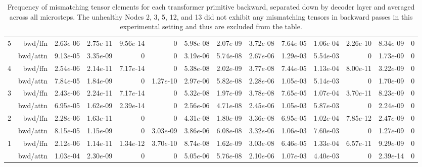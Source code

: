 \begin{table*}[t]
\begin{center}
\begin{tiny}
\begin{sc}
\begin{tabular}{rrrrrrrrrrrrrr}
\midrule
\multirow{2}{*}{5}             & bwd/ffn   & 2.63$e$-06 & 2.75$e$-11 & 9.56$e$-14 & 0 & 5.98$e$-08 & 2.07$e$-09 & 3.72$e$-08 & 7.64$e$-05 & 1.06$e$-04 & 2.26$e$-10 & 8.34$e$-09 & 0 \\
              & bwd/attn  & 9.13$e$-05 & 3.35$e$-09 & 0 & 0 & 3.19$e$-06 & 5.74$e$-08 & 2.67$e$-06 & 1.29$e$-03 & 5.54$e$-03 & 0 & 1.73$e$-09 & 0 \\
\midrule
\multirow{2}{*}{4}             & bwd/ffn   & 2.54$e$-06 & 2.14$e$-11 & 7.17$e$-14 & 0 & 5.38$e$-08 & 2.02$e$-09 & 3.77$e$-08 & 7.44$e$-05 & 1.13$e$-04 & 8.00$e$-11 & 3.22$e$-09 & 0 \\
              & bwd/attn  & 7.84$e$-05 & 1.84$e$-09 & 0 & 1.27$e$-10 & 2.97$e$-06 & 5.82$e$-08 & 2.28$e$-06 & 1.05$e$-03 & 5.14$e$-03 & 0 & 1.70$e$-09 & 0 \\
\midrule
\multirow{2}{*}{3}             & bwd/ffn   & 2.43$e$-06 & 2.24$e$-11 & 7.17$e$-14 & 0 & 5.32$e$-08 & 1.97$e$-09 & 3.78$e$-08 & 7.65$e$-05 & 1.07$e$-04 & 3.70$e$-11 & 8.23$e$-09 & 0 \\
              & bwd/attn  & 6.95$e$-05 & 1.62$e$-09 & 2.39$e$-14 & 0 & 2.56$e$-06 & 4.71$e$-08 & 2.45$e$-06 & 1.05$e$-03 & 5.87$e$-03 & 0 & 2.24$e$-09 & 0 \\
\midrule
\multirow{2}{*}{2}             & bwd/ffn   & 2.28$e$-06 & 1.63$e$-11 & 0 & 0 & 4.31$e$-08 & 1.80$e$-09 & 3.36$e$-08 & 6.95$e$-05 & 1.02$e$-04 & 7.85$e$-12 & 2.47$e$-09 & 0 \\
              & bwd/attn  & 8.15$e$-05 & 1.15$e$-09 & 0 & 3.03$e$-09 & 3.86$e$-06 & 6.08$e$-08 & 3.32$e$-06 & 1.06$e$-03 & 7.60$e$-03 & 0 & 1.27$e$-09 & 0 \\
\midrule
\multirow{2}{*}{1}             & bwd/ffn   & 2.12$e$-06 & 1.14$e$-11 & 1.34$e$-12 & 3.70$e$-10 & 8.74$e$-08 & 1.62$e$-09 & 3.03$e$-08 & 6.46$e$-05 & 1.33$e$-04 & 6.57$e$-11 & 9.29$e$-09 & 0 \\
              & bwd/attn  & 1.03$e$-04 & 2.30$e$-09 & 0 & 0 & 5.05$e$-06 & 5.76$e$-08 & 2.10$e$-06 & 1.07$e$-03 & 4.40$e$-03 & 0 & 2.39$e$-14 & 0 \\
\bottomrule
\end{tabular}

\end{sc}
\end{tiny}
\end{center}
\vskip 0.15in


\caption{Frequency of mismatching tensor elements for each transformer primitive backward, separated down by decoder layer and averaged across all microsteps. The unhealthy Nodes 2, 3, 5, 12, and 13 did not exhibit any mismatching tensors in backward passes in this experimental setting and thus are excluded from the table.}

\label{fig:backwards_primitive_frequency}
\end{table*}